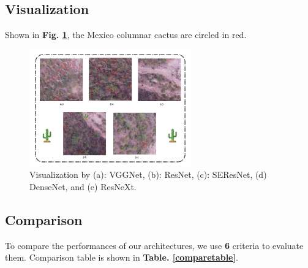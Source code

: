 \documentclass[10pt,twocolumn,letterpaper]{article}
\begin{document}
\subsection{Visualization}

Shown in \textbf{Fig. \ref{cacuav5}}, the Mexico columnar cactus are circled in red.

\begin{figure}[h]
\centering
\includegraphics[width=7cm]{cacUAV5.pdf}
\caption{Visualization by (a): \textsf{VGGNet}, (b): \textsf{ResNet}, (c): \textsf{SEResNet}, (d) \textsf{DenseNet}, and (e) \textsf{ResNeXt}.}
\label{cacuav5}
\end{figure}

\subsection{Comparison}

To compare the performances of our architectures, we use \textbf{6} criteria to evaluate them. Comparison table is shown in \textbf{Table. \ref{comparetable}}.
\end{document}
